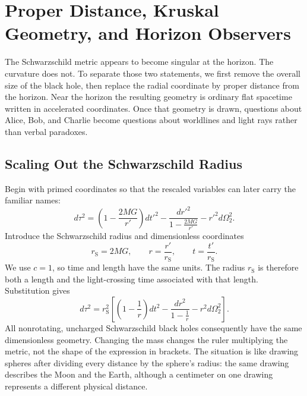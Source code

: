 \chapter{Proper Distance, Kruskal Geometry, and Horizon Observers}

The Schwarzschild metric appears to become singular at the horizon.  The
curvature does not.  To separate those two statements, we first remove the
overall size of the black hole, then replace the radial coordinate by proper
distance from the horizon.  Near the horizon the resulting geometry is
ordinary flat spacetime written in accelerated coordinates.  Once that
geometry is drawn, questions about Alice, Bob, and Charlie become questions
about worldlines and light rays rather than verbal paradoxes.

\section{Scaling Out the Schwarzschild Radius}

Begin with primed coordinates so that the rescaled variables can later carry
the familiar names:
\begin{equation}
d\tau^2
=
\left(1-\frac{2MG}{r'}\right)dt'^2
-
\frac{dr'^2}{1-\frac{2MG}{r'}}
-
r'^2d\Omega_2^2.
\label{eq:l7-schwarzschild-dimensional}
\end{equation}
Introduce the Schwarzschild radius and dimensionless coordinates
\begin{equation}
r_{\mathrm S}=2MG,
\qquad
r=\frac{r'}{r_{\mathrm S}},
\qquad
t=\frac{t'}{r_{\mathrm S}}.
\label{eq:l7-rescaling}
\end{equation}
We use \(c=1\), so time and length have the same units.  The radius
\(r_{\mathrm S}\) is therefore both a length and the light-crossing time
associated with that length.  Substitution gives
\begin{equation}
d\tau^2
=r_{\mathrm S}^2
\left[
\left(1-\frac1r\right)dt^2
-
\frac{dr^2}{1-\frac1r}
-
r^2d\Omega_2^2
\right].
\label{eq:l7-schwarzschild-rescaled}
\end{equation}
All nonrotating, uncharged Schwarzschild black holes consequently have the
same dimensionless geometry.  Changing the mass changes the ruler multiplying
the metric, not the shape of the expression in brackets.  The situation is
like drawing spheres after dividing every distance by the sphere's radius:
the same drawing describes the Moon and the Earth, although a centimeter on
one drawing represents a different physical distance.

